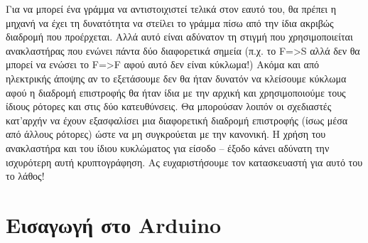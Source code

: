 \documentclass[a4paper,twoside,12pt]{article}
\begin{document}
Για να μπορεί ένα γράμμα να αντιστοιχιστεί τελικά στον εαυτό του, θα πρέπει η μηχανή να έχει τη δυνατότητα να στείλει το γράμμα πίσω από την ίδια ακριβώς διαδρομή που προέρχεται. Αλλά αυτό είναι αδύνατον τη στιγμή που χρησιμοποιείται ανακλαστήρας που ενώνει πάντα δύο διαφορετικά σημεία (π.χ. το F=>S αλλά δεν θα μπορεί να ενώσει το F=>F αφού αυτό δεν είναι κύκλωμα!) Ακόμα και από ηλεκτρικής άποψης αν το εξετάσουμε δεν θα ήταν δυνατόν να κλείσουμε κύκλωμα αφού η διαδρομή επιστροφής θα ήταν ίδια με την αρχική και χρησιμοποιούμε τους ίδιους ρότορες και στις δύο κατευθύνσεις. Θα μπορούσαν λοιπόν οι σχεδιαστές κατ'αρχήν να έχουν εξασφαλίσει μια διαφορετική διαδρομή επιστροφής (ίσως μέσα από άλλους ρότορες) ώστε να μη συγκρούεται με την κανονική. Η χρήση του ανακλαστήρα και του ίδιου κυκλώματος για είσοδο – έξοδο κάνει αδύνατη την ισχυρότερη αυτή κρυπτογράφηση. Ας ευχαριστήσουμε τον κατασκευαστή για αυτό του το λάθος!
\newpage
\section{Εισαγωγή στο Arduino}
\end{document}

